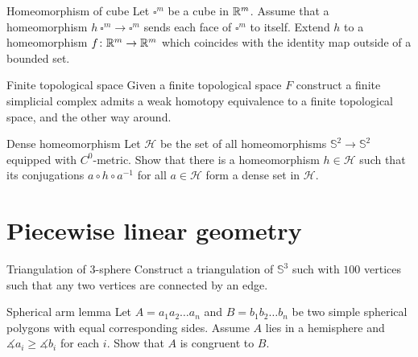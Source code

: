 \documentclass[twoside]{book}
\begin{document}
{\begin{pr}{}{Homeomorphism of cube}\label{Homeomorphism of cube}
Let $\square^m$ be a cube in $\mathbb{R}^m$.
Assume that a homeomorphism $h\:\square^m\to\square^m$ sends each face of $\square^m$ to itself.
Extend $h$ to a homeomorphism $f\colon\mathbb{R}^m\to\mathbb{R}^m$ which coincides with the identity map outside of a bounded set.    
\end{pr}


\begin{pr}{\easy}{Finite topological space}\label{Finite topological space}
Given a finite topological space $F$ 
construct a finite simplicial complex admits a weak homotopy equivalence  
to a finite topological space, 
and the other way around. 
\end{pr}

\begin{pr}{\easy}{Dense homeomorphism}\label{Dense homeomorphism}
Let $\mathcal{H}$ be the set of all homeomorphisms $\mathbb {S}^2\to\mathbb {S}^2$ equipped with $C^0$-metric.
Show that there is a homeomorphism $h\in \mathcal{H}$ such that its conjugations $a\circ h\circ a^{-1}$ for all $a\in\mathcal{H}$ form a dense set in $\mathcal{H}$.
 
\end{pr}












\chapter{Piecewise linear geometry}




\begin{pr}{}{Triangulation of 3-sphere}\label{4-poly}
Construct a triangulation of $\mathbb{S}^3$ 
such with $100$ vertices
such that any two vertices are connected by an edge.
\end{pr}

\begin{pr}{}{Spherical arm lemma}\label{Spherical arm lemma}
Let $A=a_1a_2\dots a_n$ and $B=b_1b_2\dots b_n$ be two simple spherical polygons 
with equal corresponding sides.
Assume $A$ lies in a hemisphere and $\measuredangle a_i\ge\measuredangle b_i$ for each $i$.
Show that $A$ is congruent to $B$.
\end{pr}



}
\end{document}
